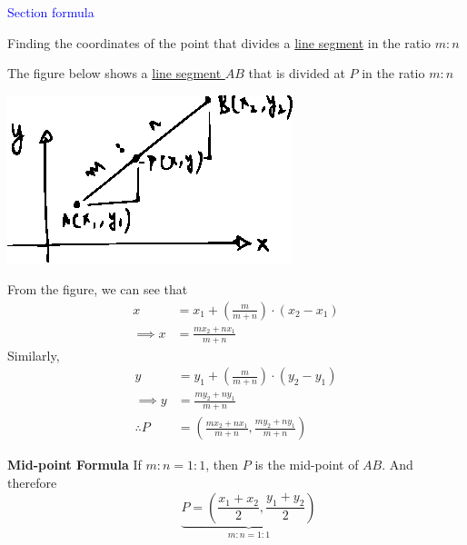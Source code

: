 \documentclass[14pt,fleqn]{extarticle}
\begin{document}
 
\begin{skill}
    \begin{narrow}
         \textcolor{blue}{Section formula}
         
         Finding the coordinates of the point that divides a \underline{line segment} 
         in the ratio $m:n$
    \end{narrow}
    
    \reason 
    
    The figure below shows a \underline{line segment $AB$} that is divided at $P$ in the ratio $m:n$ \newline 
    
    \begin{center}
\includegraphics[scale=1.65]{136-A.eps}
\end{center}
    
    From the figure, we can see that 
    \begin{align}
	x &= x_1 + \left(\frac{m}{m+n} \right)\cdot \left(x_2 - x_1 \right) \\
	\implies x &= \frac{mx_2 + nx_1}{m+n}
\end{align}
Similarly, 
\begin{align}
	y &= y_1 + \left(\frac{m}{m+n} \right)\cdot \left(y_2 - y_1 \right) \\
	\implies y &= \frac{my_2 + ny_1}{m+n} \\
	\therefore P &= \left(\frac{mx_2 + nx_1}{m+n}, \frac{my_2 + ny_1}{m+n} \right)
\end{align}

\textbf{Mid-point Formula} \newline 
If $m:n = 1:1$, then $P$ is the mid-point of $AB$. And therefore 
\[ \qquad \underbrace{P = \left(\frac{x_1 + x_2}{2}, \frac{y_1+y_2}{2} \right)}_{m : n = 1:1}\]
    
\end{skill}
\end{document}
